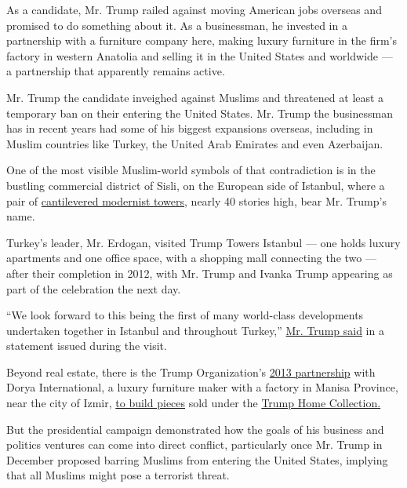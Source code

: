As a candidate, Mr. Trump railed against moving American jobs overseas
and promised to do something about it. As a businessman, he invested in
a partnership with a furniture company here, making luxury furniture in
the firm's factory in western Anatolia and selling it in the United
States and worldwide --- a partnership that apparently remains active.

Mr. Trump the candidate inveighed against Muslims and threatened at
least a temporary ban on their entering the United States. Mr. Trump the
businessman has in recent years had some of his biggest expansions
overseas, including in Muslim countries like Turkey, the United Arab
Emirates and even Azerbaijan.

One of the most visible Muslim-world symbols of that contradiction is in
the bustling commercial district of Sisli, on the European side of
Istanbul, where a pair of
\href{http://www.trump.com/real-estate-portfolio/istanbul/trump-towers/}{cantilevered
modernist towers}, nearly 40 stories high, bear Mr. Trump's name.

Turkey's leader, Mr. Erdogan, visited Trump Towers Istanbul --- one
holds luxury apartments and one office space, with a shopping mall
connecting the two --- after their completion in 2012, with Mr. Trump
and Ivanka Trump appearing as part of the celebration the next day.

``We look forward to this being the first of many world-class
developments undertaken together in Istanbul and throughout Turkey,''
\href{http://www.prnewswire.com/news-releases/donald-j-trump-and-ivanka-trump-visit-istanbul-to-celebrate-the-opening-of-highly-anticipated-trump-towers-mall-150816665.html}{Mr.
Trump said} in a statement issued during the visit.

Beyond real estate, there is the Trump Organization's
\href{http://www.trumphomecollection.com/pages/trump-home-press-releases\#6}{2013
partnership} with Dorya International, a luxury furniture maker with a
factory in Manisa Province, near the city of Izmir,
\href{http://www.trumphomecollection.com/pages/trump-home-press-releases}{to
build pieces} sold under the
\href{http://www.trumphomecollection.com/}{Trump Home Collection.}

But the presidential campaign demonstrated how the goals of his business
and politics ventures can come into direct conflict, particularly once
Mr. Trump in December proposed barring Muslims from entering the United
States, implying that all Muslims might pose a terrorist threat.

